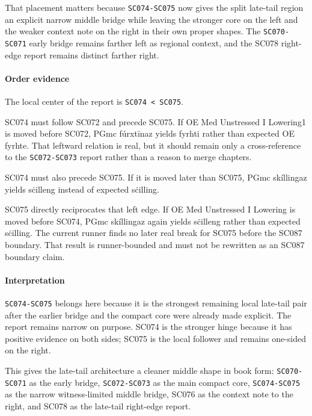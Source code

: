 \documentclass[
  british,
  a4paper,
]{article}
\begin{document}
That placement matters because \texttt{SC074-SC075} now gives the split
late-tail region an explicit narrow middle bridge while leaving the
stronger core on the left and the weaker context note on the right in
their own proper shapes. The \texttt{SC070-SC071} early bridge remains
farther left as regional context, and the SC078 right-edge report
remains distinct farther right.

\paragraph{Order evidence}\label{order-evidence-46}

The local center of the report is \texttt{SC074\ \textless{}\ SC075}.

SC074 must follow SC072 and precede SC075. If OE Med Unstressed I
Lowering1 is moved before SC072, PGmc fúrxtīnaz yields fyrhti rather
than expected OE fyrhte. That leftward relation is real, but it should
remain only a cross-reference to the \texttt{SC072-SC073} report rather
than a reason to merge chapters.

SC074 must also precede SC075. If it is moved later than SC075, PGmc
skíllingaz yields sċilleng instead of expected sċilling.

SC075 directly reciprocates that left edge. If OE Med Unstressed I
Lowering is moved before SC074, PGmc skíllingaz again yields sċilleng
rather than expected sċilling. The current runner finds no later real
break for SC075 before the SC087 boundary. That result is runner-bounded
and must not be rewritten as an SC087 boundary claim.

\paragraph{Interpretation}\label{interpretation-46}

\texttt{SC074-SC075} belongs here because it is the strongest remaining
local late-tail pair after the earlier bridge and the compact core were
already made explicit. The report remains narrow on purpose. SC074 is
the stronger hinge because it has positive evidence on both sides; SC075
is the local follower and remains one-sided on the right.

This gives the late-tail architecture a cleaner middle shape in book
form: \texttt{SC070-SC071} as the early bridge, \texttt{SC072-SC073} as
the main compact core, \texttt{SC074-SC075} as the narrow
witness-limited middle bridge, SC076 as the context note to the right,
and SC078 as the late-tail right-edge report.
\end{document}
